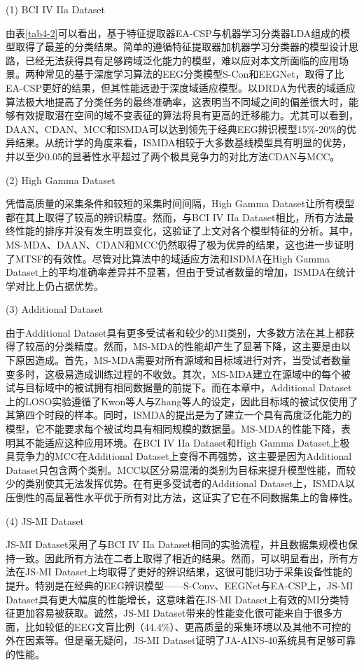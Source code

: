(1) BCI IV IIa Dataset

由表\ref{tab4-2}可以看出，基于特征提取器EA-CSP与机器学习分类器LDA组成的模型取得了最差的分类结果。简单的遵循特征提取器加机器学习分类器的模型设计思路，已经无法获得具有足够跨域泛化能力的模型，难以应对本文所面临的应用场景。两种常见的基于深度学习算法的EEG分类模型S-Con和EEGNet，取得了比EA-CSP更好的结果，但其性能远逊于深度域适应模型。以DRDA为代表的域适应算法极大地提高了分类任务的最终准确率，这表明当不同域之间的偏差很大时，能够有效提取潜在空间的域不变表征的算法将具有更高的迁移能力。尤其可以看到，DAAN、CDAN、MCC和ISMDA可以达到领先于经典EEG辨识模型15\%-20\%的优异结果。从统计学的角度来看，ISMDA相较于大多数基线模型具有明显的优势，并以至少0.05的显著性水平超过了两个极具竞争力的对比方法CDAN与MCC。 

(2) High Gamma Dataset

凭借高质量的采集条件和较短的采集时间间隔，High Gamma Dataset让所有模型都在其上取得了较高的辨识精度。然而，与BCI IV IIa Dataset相比，所有方法最终性能的排序并没有发生明显变化，这验证了上文对各个模型特征的分析。其中，MS-MDA、DAAN、CDAN和MCC仍然取得了极为优异的结果，这也进一步证明了MTSF的有效性。尽管对比算法中的域适应方法和ISDMA在High Gamma Dataset上的平均准确率差异并不显著，但由于受试者数量的增加，ISMDA在统计学对比上仍占据优势。

(3) Additional Dataset

由于Additional Dataset具有更多受试者和较少的MI类别，大多数方法在其上都获得了较高的分类精度。然而，MS-MDA的性能却产生了显著下降，这主要是由以下原因造成。首先，MS-MDA需要对所有源域和目标域进行对齐，当受试者数量变多时，这极易造成训练过程的不收敛。其次，MS-MDA建立在源域中的每个被试与目标域中的被试拥有相同数据量的前提下。而在本章中，Additional Dataset上的LOSO实验遵循了Kwon等人\cite{4-12}与Zhang等人\cite{4-13}的设定，因此目标域的被试仅使用了其第四个时段的样本。同时，ISMDA的提出是为了建立一个具有高度泛化能力的模型，它不能要求每个被试均具有相同规模的数据量。MS-MDA的性能下降，表明其不能适应这种应用环境。在BCI IV IIa Dataset和High Gamma Dataset上极具竞争力的MCC在Additional Dataset上变得不再强势，这主要是因为Additional Dataset只包含两个类别。MCC以区分易混淆的类别为目标来提升模型性能，而较少的类别使其无法发挥优势。在有更多受试者的Additional Dataset上，ISMDA以压倒性的高显著性水平优于所有对比方法，这证实了它在不同数据集上的鲁棒性。

(4) JS-MI Dataset

JS-MI Dataset采用了与BCI IV IIa Dataset相同的实验流程，并且数据集规模也保持一致。因此所有方法在二者上取得了相近的结果。然而，可以明显看出，所有方法在JS-MI Dataset上均取得了更好的辨识结果，这很可能归功于采集设备性能的提升。特别是在经典的EEG辨识模型——S-Conv、EEGNet与EA-CSP上，JS-MI Dataset具有更大幅度的性能增长，这意味着在JS-MI Dataset上有效的MI分类特征更加容易被获取。诚然，JS-MI Dataset带来的性能变化很可能来自于很多方面，比如较低的EEG文盲比例（44.4\%）、更高质量的采集环境以及其他不可控的外在因素等。但是毫无疑问，JS-MI Dataset证明了JA-AINS-40系统具有足够可靠的性能。

